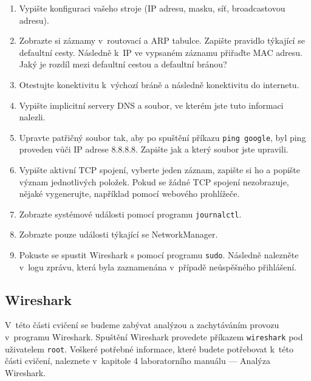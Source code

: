 \begin{enumerate}
\item Vypište konfiguraci vašeho stroje (IP adresu, masku, síť, broadcastovou adresu).
\item Zobrazte si záznamy v~routovací a ARP tabulce. Zapište pravidlo týkající se defaultní cesty. Následně k~IP ve vypsaném záznamu přiřaďte MAC adresu. Jaký je rozdíl mezi defaultní cestou a defaultní bránou?
\item Otestujte konektivitu k~výchozí bráně a následně konektivitu do internetu.
\item Vypište implicitní servery DNS a soubor, ve kterém jste tuto informaci nalezli.
\item Upravte patřičný soubor tak, aby po spuštění příkazu \texttt{ping google}, byl ping proveden vůči IP adrese 8.8.8.8. Zapište jak a který soubor jste upravili.
\item Vypište aktivní TCP spojení, vyberte jeden záznam, zapište si ho a popište význam jednotlivých položek. Pokud se žádné TCP spojení nezobrazuje, nějaké vygenerujte, například pomocí webového prohlížeče.
\item Zobrazte systémové události pomocí programu \texttt{journalctl}.
\item Zobrazte pouze události týkající se NetworkManager.
\item Pokuste se spustit Wireshark s pomocí programu \texttt{sudo}. Následně nalezněte v~logu zprávu, která byla zaznamenána v~případě neúspěšného přihlášení.
\end{enumerate}

\subsection{Wireshark}
V~této části cvičení se budeme zabývat analýzou a zachytáváním provozu
v~programu Wireshark. Spuštění Wireshark provedete příkazem \texttt{wireshark}
pod uživatelem \texttt{root}. Veškeré potřebné informace, které budete
potřebovat k~této části cvičení, naleznete v~kapitole 4 laboratorního manuálu
--- Analýza Wireshark.

